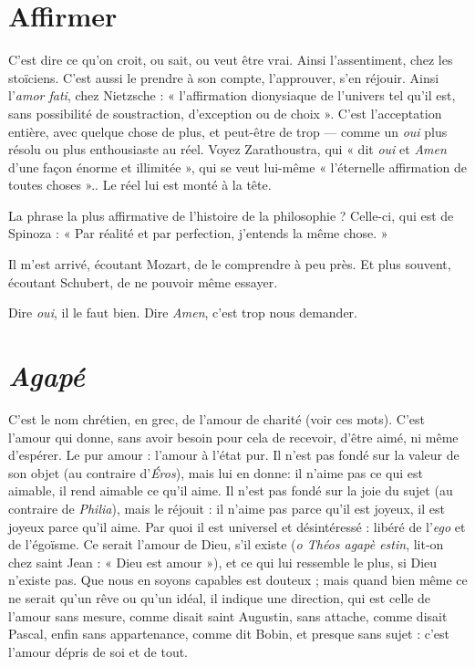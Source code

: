 \section{Affirmer}
C'est dire ce qu’on croit, ou sait, ou veut être vrai. Ainsi l’assentiment,
chez les stoïciens. C’est aussi le prendre à son compte,
l’approuver, s’en réjouir. Ainsi l’{\it amor fati}, chez Nietzsche : « l'affirmation dionysiaque
de l’univers tel qu’il est, sans possibilité de soustraction, d'exception
ou de choix ». C’est l'acceptation entière, avec quelque chose de plus, et peut-être
de trop — comme un {\it oui} plus résolu ou plus enthousiaste au réel. Voyez
Zarathoustra, qui « dit {\it oui} et {\it Amen} d’une façon énorme et illimitée », qui se
veut lui-même « l’éternelle affirmation de toutes choses ».. Le réel lui est
monté à la tête.

La phrase la plus affirmative de l’histoire de la philosophie ? Celle-ci, qui
est de Spinoza : « Par réalité et par perfection, j'entends la même chose. »

Il m'est arrivé, écoutant Mozart, de le comprendre à peu près. Et plus souvent,
écoutant Schubert, de ne pouvoir même essayer.

Dire {\it oui}, il le faut bien. Dire {\it Amen}, c’est trop nous demander.

\section{\it Agapé}
C’est le nom chrétien, en grec, de l'amour de charité (voir ces mots).
C’est l'amour qui donne, sans avoir besoin pour cela de recevoir,
d’être aimé, ni même d’espérer. Le pur amour : l’amour à l’état pur. Il n’est pas
fondé sur la valeur de son objet (au contraire d’{\it Éros}), mais lui en donne: il
n’aime pas ce qui est aimable, il rend aimable ce qu’il aime. Il n’est pas fondé
sur la joie du sujet (au contraire de {\it Philia}), mais le réjouit : il n'aime pas parce
qu'il est joyeux, il est joyeux parce qu’il aime. Par quoi il est universel et
désintéressé : libéré de l'{\it ego} et de l’égoïsme. Ce serait l'amour de Dieu, s'il
existe ({\it o Théos agapè estin}, lit-on chez saint Jean : « Dieu est amour »), et ce qui
lui ressemble le plus, si Dieu n’existe pas. Que nous en soyons capables est
douteux ; mais quand bien même ce ne serait qu’un rêve ou qu’un idéal, il
indique une direction, qui est celle de l'amour sans mesure, comme disait saint
Augustin, sans attache, comme disait Pascal, enfin sans appartenance, comme
dit Bobin, et presque sans sujet : c’est l'amour dépris de soi et de tout.

